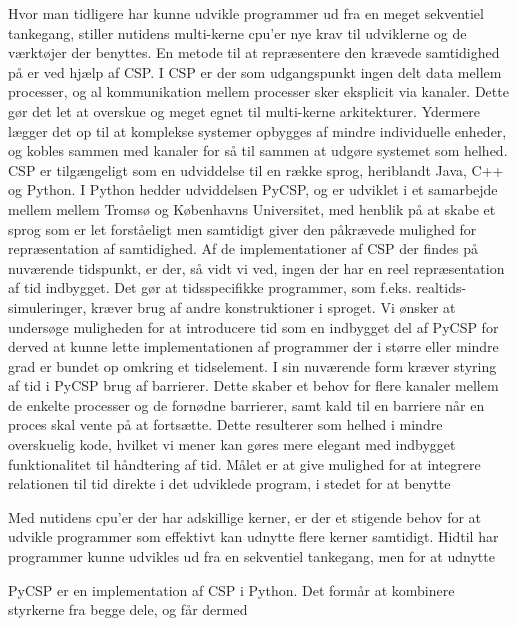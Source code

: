 Hvor man tidligere har kunne udvikle programmer ud fra en meget sekventiel 
tankegang, stiller nutidens multi-kerne cpu'er nye krav til udviklerne og de 
værktøjer der benyttes.  
En metode til at repræsentere den krævede samtidighed på er ved hjælp af 
CSP\cite{hoare-csp}.  I CSP er der som udgangspunkt ingen delt data mellem 
processer, og al kommunikation mellem processer sker eksplicit via kanaler.  
Dette gør det let at overskue og meget egnet til multi-kerne arkitekturer.  
Ydermere lægger det op til at komplekse systemer opbygges af mindre 
individuelle enheder, og kobles sammen med kanaler for så til sammen at udgøre 
systemet som helhed. CSP er tilgængeligt som en udviddelse til en række sprog, 
heriblandt Java, C++ og Python. I Python hedder udviddelsen PyCSP, og er 
udviklet i et samarbejde mellem mellem Tromsø og Københavns Universitet, med 
henblik på at skabe et sprog som er let forståeligt men samtidigt giver den 
påkrævede mulighed for repræsentation af samtidighed.  Af de implementationer 
af CSP der findes på nuværende tidspunkt, er der, så vidt vi ved, ingen der har 
en reel repræsentation af tid indbygget. Det gør at tidsspecifikke programmer, 
som f.eks. realtids-simuleringer, kræver brug af andre konstruktioner i 
sproget.
Vi ønsker at undersøge muligheden for at introducere tid som en indbygget del 
af PyCSP for derved at kunne lette implementationen af programmer der i større 
eller mindre grad er bundet op omkring et tidselement. I sin nuværende form 
kræver styring af tid i PyCSP brug af barrierer. Dette skaber et behov for flere kanaler mellem de enkelte 
processer og de fornødne barrierer, samt kald til en barriere når en proces 
skal vente på at fortsætte.  Dette resulterer som helhed i mindre overskuelig 
kode, hvilket vi mener kan gøres mere elegant med indbygget funktionalitet til 
håndtering af tid. Målet er at give mulighed for at integrere relationen til 
tid direkte i det udviklede program, i stedet for at benytte 


Med nutidens cpu'er der har adskillige kerner, er der et stigende behov for at 
udvikle programmer som effektivt kan udnytte flere kerner samtidigt. Hidtil har 
programmer kunne udvikles ud fra en sekventiel tankegang, men for at udnytte 



PyCSP er en implementation af CSP i Python. Det formår at kombinere styrkerne 
fra begge dele, og får dermed 

